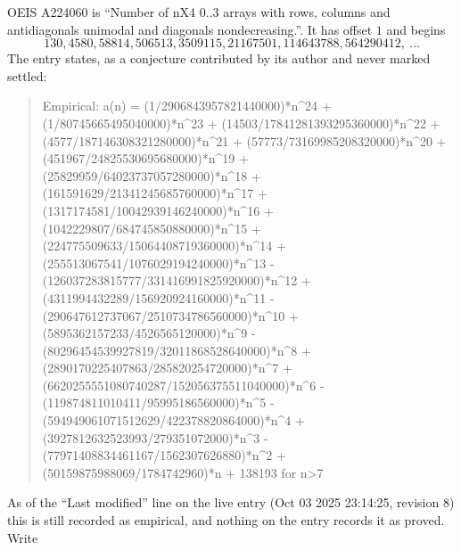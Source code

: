 \documentclass[11pt,a4paper]{article}
\theoremstyle{plain}
\theoremstyle{definition}
\begin{document}
OEIS A224060 is ``Number of nX4 0..3 arrays with rows, columns and antidiagonals unimodal and diagonals nondecreasing.''. It has offset $1$ and begins
\[
130, 4580, 58814, 506513, 3509115, 21167501, 114643788, 564290412,\ \dots
\]
The entry states, as a conjecture contributed by its author and never marked settled:
\begin{quote}\raggedright\small
Empirical: a(n) = (1/2906843957821440000)*n\^{}24 + (1/80745665495040000)*n\^{}23 + (14503/17841281393295360000)*n\^{}22 + (4577/187146308321280000)*n\^{}21 + (57773/73169985208320000)*n\^{}20 + (451967/24825530695680000)*n\^{}19 + (25829959/64023737057280000)*n\^{}18 + (161591629/21341245685760000)*n\^{}17 + (1317174581/10042939146240000)*n\^{}16 + (1042229807/684745850880000)*n\^{}15 + (224775509633/15064408719360000)*n\^{}14 + (255513067541/1076029194240000)*n\^{}13 - (126037283815777/331416991825920000)*n\^{}12 + (4311994432289/156920924160000)*n\^{}11 - (290647612737067/2510734786560000)*n\^{}10 + (5895362157233/4526565120000)*n\^{}9 - (80296454539927819/32011868528640000)*n\^{}8 + (2890170225407863/285820254720000)*n\^{}7 + (6620255551080740287/152056375511040000)*n\^{}6 - (119874811010411/95995186560000)*n\^{}5 - (594949061071512629/422378820864000)*n\^{}4 + (3927812632523993/279351072000)*n\^{}3 - (77971408834461167/1562307626880)*n\^{}2 + (50159875988069/1784742960)*n + 138193 for n>7
\end{quote}
As of the ``Last modified'' line on the live entry (Oct 03 2025 23:14:25, revision 8) this is still
recorded as empirical, and nothing on the entry records it as proved. Write
\end{document}

